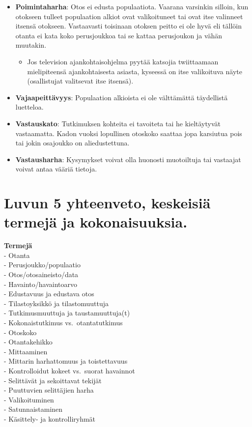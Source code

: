 \documentclass[
]{book}
\providecommand{\tightlist}{%
  \setlength{\itemsep}{0pt}\setlength{\parskip}{0pt}}
\begin{document}
\begin{itemize}
\item
  \textbf{Poimintaharha}: Otos ei edusta populaatiota. Vaarana varsinkin silloin, kun otokseen tulleet populaation alkiot ovat valikoituneet tai ovat itse valinneet itsensä otokseen. Vastaavasti toisinaan otoksen peitto ei ole hyvä eli tällöin otanta ei kata koko perusjoukkoa tai se kattaa perusjoukon ja vähän muutakin.

  \begin{itemize}
  \tightlist
  \item
    Jos television ajankohtaisohjelma pyytää katsojia twiittaamaan mielipiteensä ajankohtaisesta asiasta, kyseessä on itse valikoituva näyte (osallistujat valitsevat itse itsensä).
  \end{itemize}
\item
  \textbf{Vajaapeittävyys}: Populaation alkioista ei ole välttämättä täydellistä luetteloa.
\item
  \textbf{Vastauskato}: Tutkimuksen kohteita ei tavoiteta tai he kieltäytyvät vastaamatta. Kadon vuoksi lopullinen otoskoko saattaa jopa karsiutua pois tai jokin osajoukko on aliedustettuna.
\item
  \textbf{Vastausharha}: Kysymykset voivat olla huonosti muotoiltuja tai vastaajat voivat antaa vääriä tietoja.
\end{itemize}

\hypertarget{luvun-5-yhteenveto-keskeisiuxe4-termejuxe4-ja-kokonaisuuksia.}{%
\section{Luvun 5 yhteenveto, keskeisiä termejä ja kokonaisuuksia.}\label{luvun-5-yhteenveto-keskeisiuxe4-termejuxe4-ja-kokonaisuuksia.}}

\textbf{Termejä}\\
- Otanta\\
- Perusjoukko/populaatio\\
- Otos/otosaineisto/data\\
- Havainto/havaintoarvo\\
- Edustavuus ja edustava otos\\
- Tilastoyksikkö ja tilastomuuttuja\\
- Tutkimusmuuttuja ja taustamuuttuja(t)\\
- Kokonaistutkimus vs.~otantatutkimus\\
- Otoskoko\\
- Otantakehikko\\
- Mittaaminen\\
- Mittarin harhattomuus ja toistettavuus\\
- Kontrolloidut kokeet vs.~suorat havainnot\\
- Selittävät ja sekoittavat tekijät\\
- Puuttuvien selittäjien harha\\
- Valikoituminen\\
- Satunnaistaminen\\
- Käsittely- ja kontrolliryhmät
\end{document}

